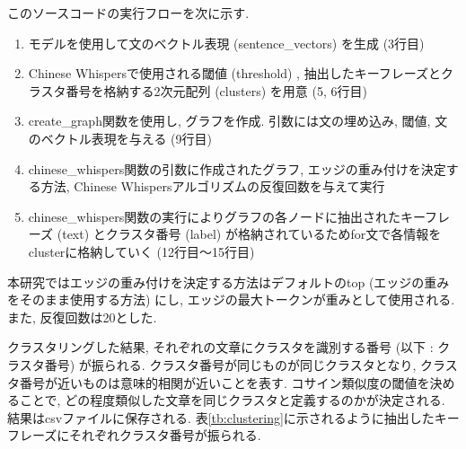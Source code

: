 このソースコードの実行フローを次に示す. 

\begin{enumerate}
  \item モデルを使用して文のベクトル表現 (sentence\_vectors) を生成 (3行目) 
  \item Chinese Whispersで使用される閾値 (threshold) , 抽出したキーフレーズとクラスタ番号を格納する2次元配列 (clusters) を用意 (5, 6行目)
  \item create\_graph関数を使用し, グラフを作成. 引数には文の埋め込み, 閾値, 文のベクトル表現を与える (9行目)
  \item chinese\_whispers関数の引数に作成されたグラフ, エッジの重み付けを決定する方法, Chinese Whispersアルゴリズムの反復回数を与えて実行
  \item chinese\_whispers関数の実行によりグラフの各ノードに抽出されたキーフレーズ (text) とクラスタ番号 (label) が格納されているためfor文で各情報をclusterに格納していく (12行目〜15行目)
\end{enumerate}

本研究ではエッジの重み付けを決定する方法はデフォルトのtop (エッジの重みをそのまま使用する方法) にし, エッジの最大トークンが重みとして使用される. また, 反復回数は20とした. 

クラスタリングした結果, それぞれの文章にクラスタを識別する番号 (以下 : クラスタ番号) が振られる. クラスタ番号が同じものが同じクラスタとなり, クラスタ番号が近いものは意味的相関が近いことを表す. コサイン類似度の閾値を決めることで, どの程度類似した文章を同じクラスタと定義するのかが決定される. 
結果はcsvファイルに保存される. 表\ref{tb:clustering}に示されるように抽出したキーフレーズにそれぞれクラスタ番号が振られる. 

